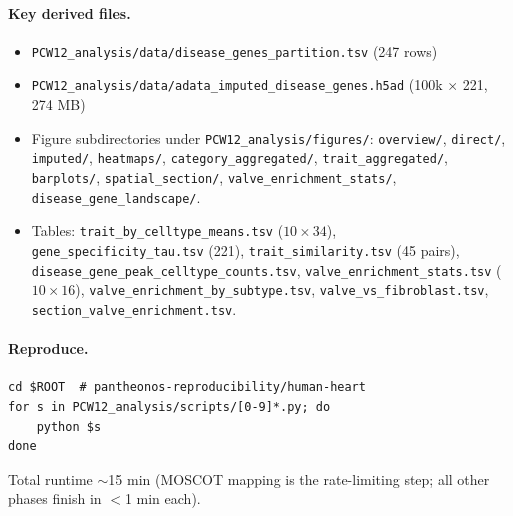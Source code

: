 \documentclass[11pt,a4paper]{article}
\begin{document}
\paragraph{Key derived files.}
\begin{itemize}[leftmargin=*,itemsep=1pt]
    \item \texttt{PCW12\_analysis/data/disease\_genes\_partition.tsv} (247 rows)
    \item \texttt{PCW12\_analysis/data/adata\_imputed\_disease\_genes.h5ad} (100k $\times$ 221, 274 MB)
    \item Figure subdirectories under \texttt{PCW12\_analysis/figures/}: \texttt{overview/}, \texttt{direct/}, \texttt{imputed/}, \texttt{heatmaps/}, \texttt{category\_aggregated/}, \texttt{trait\_aggregated/}, \texttt{barplots/}, \texttt{spatial\_section/}, \texttt{valve\_enrichment\_stats/}, \texttt{disease\_gene\_landscape/}.
    \item Tables: \texttt{trait\_by\_celltype\_means.tsv} ($10\times34$), \texttt{gene\_specificity\_tau.tsv} (221), \texttt{trait\_similarity.tsv} (45 pairs), \texttt{disease\_gene\_peak\_celltype\_counts.tsv}, \texttt{valve\_enrichment\_stats.tsv} ($10\times16$), \texttt{valve\_enrichment\_by\_subtype.tsv}, \texttt{valve\_vs\_fibroblast.tsv}, \texttt{section\_valve\_enrichment.tsv}.
\end{itemize}

\paragraph{Reproduce.}
\begin{verbatim}
cd $ROOT  # pantheonos-reproducibility/human-heart
for s in PCW12_analysis/scripts/[0-9]*.py; do
    python $s
done
\end{verbatim}
Total runtime $\sim$15 min (MOSCOT mapping is the rate-limiting step;
all other phases finish in $<$1 min each).
\end{document}
